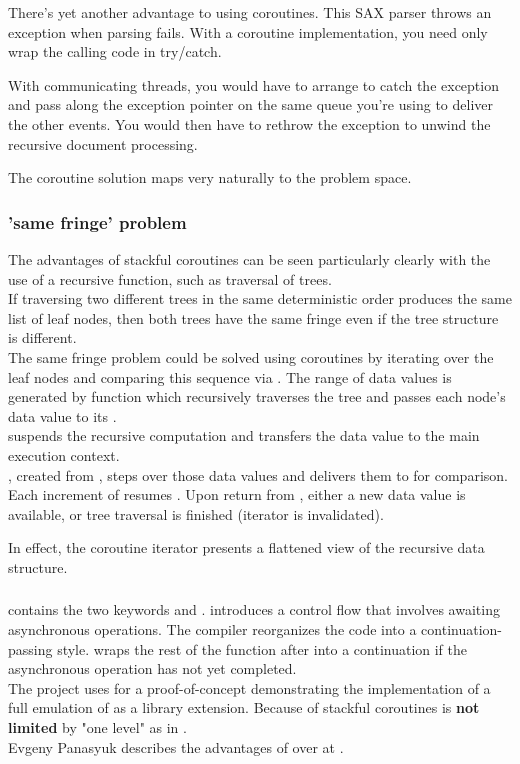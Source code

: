 There's yet another advantage to using coroutines. This SAX parser throws an
exception when parsing fails. With a coroutine implementation, you need only
wrap the calling code in try/catch.

With communicating threads, you would have to arrange to catch the exception
and pass along the exception pointer on the same queue you're using to deliver
the other events. You would then have to rethrow the exception to unwind the
recursive document processing.

The coroutine solution maps very naturally to the problem space.

\subsubsection*{'same fringe' problem}
The advantages of stackful coroutines can be seen particularly clearly with
the use of a recursive function, such as traversal of trees.\\
If traversing two different trees in the same deterministic order produces the
same list of leaf nodes, then both trees have the same fringe even if the tree
structure is different.\\
\newline
The same fringe problem could be solved using coroutines by iterating over the
leaf nodes and comparing this sequence via . The range of data
values is generated by function  which recursively traverses the
tree and passes each node's data value to its \pushcoro.\\
\pushcoro suspends the recursive computation and transfers the data value to
the main execution context.\\
\pullcoroiterator, created from \pullcoro, steps over those data values and
delivers them to  for comparison. Each increment of
 \pullcoroiterator resumes . Upon return
from , either a new data value is available, or
tree traversal is finished (iterator is invalidated).

In effect, the coroutine iterator presents a flattened view of the recursive
data structure.

\subsubsection*{\csharp \await}
\csharp contains the two keywords \async and \await. \async introduces a
control flow that involves awaiting asynchronous operations. The compiler
reorganizes the code into a continuation-passing style. \await wraps the rest
of the function after \await into a continuation if the asynchronous
operation has not yet completed.\\
The project \awaitemu uses \boostcoroutine for a proof-of-concept
demonstrating the implementation of a full emulation of \csharp \await as a
library extension. Because of stackful coroutines \await is \textbf{not limited}
by "one level" as in \csharp.\\
Evgeny Panasyuk describes the advantages of \boostcoroutine over \await at
\channelnine.
